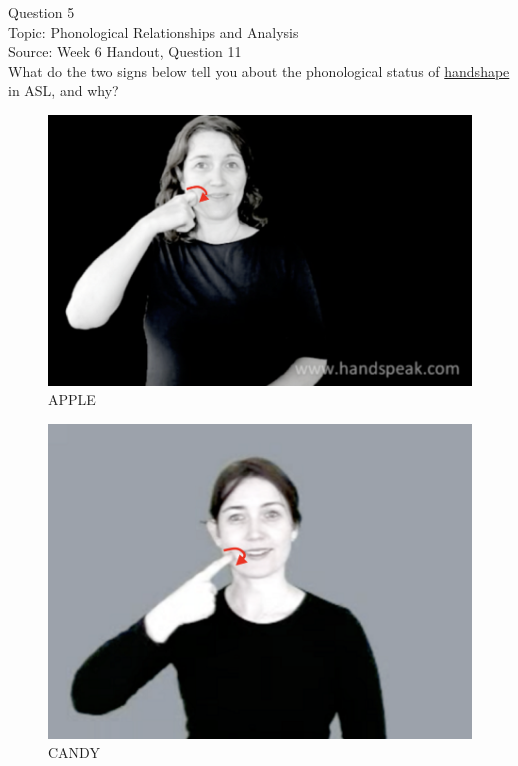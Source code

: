 \documentclass[12pt]{article}
\begin{document}
\newpage

{\large Question 5}\\

Topic: Phonological Relationships and Analysis\\
Source: Week 6 Handout, Question 11\\

What do the two signs below tell you about the phonological status of \underline{handshape} in ASL, and why?\\

\begin{figure}[H]
\includegraphics{../images/asl_apple.png}
\caption{APPLE}
\end{figure}
\begin{figure}[H]
\includegraphics{../images/asl_candy.png}
\caption{CANDY}
\end{figure}
\end{document}
